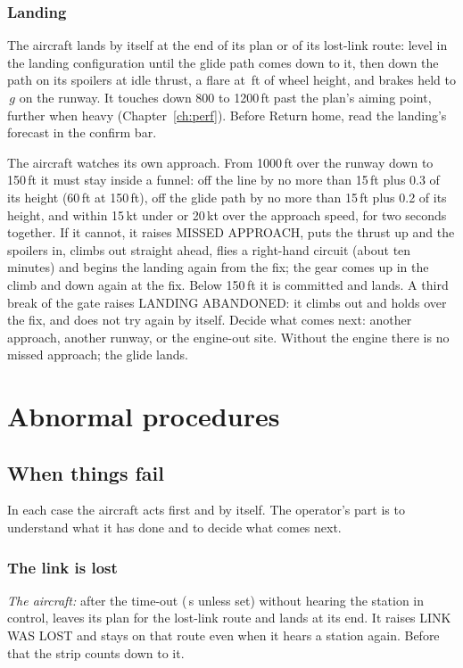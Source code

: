\documentclass[11pt,a4paper,oneside]{book}
\newcommand{\ann}[1]{\textsf{#1}}
\begin{document}
\section{Landing}
The aircraft lands by itself at the end of its plan or of its lost-link route: level in the landing configuration
until the glide path comes down to it, then down the path on its spoilers at idle thrust, a flare at \MFlareHeight\,ft
of wheel height, and brakes held to \MDecel\,$g$ on the runway. It touches down 800 to 1200\,ft past the plan's
aiming point, further when heavy (Chapter~\ref{ch:perf}). Before \ann{Return home}, read the landing's forecast in the confirm bar.

The aircraft watches its own approach. From 1000\,ft over the runway down to 150\,ft it must stay inside a funnel: off the
line by no more than 15\,ft plus 0.3 of its height (60\,ft at 150\,ft), off the glide path by no more than 15\,ft plus 0.2 of
its height, and within 15\,kt under or 20\,kt over the approach speed, for two seconds together. If it cannot, it raises
\ann{MISSED APPROACH}, puts the thrust up and the spoilers in, climbs out straight ahead, flies a right-hand circuit
(about ten minutes) and begins the landing again from the fix; the gear comes up in the climb and down again at the fix.
Below 150\,ft it is committed and lands. A third break of the gate raises \ann{LANDING ABANDONED}: it climbs out and holds
over the fix, and does not try again by itself. Decide what comes next: another approach, another runway, or the
engine-out site. Without the engine there is no missed approach; the glide lands.

\part{Abnormal procedures}
\chapter{When things fail}
In each case the aircraft acts first and by itself. The operator's part is to understand what it has done and to
decide what comes next.

\section{The link is lost}
\emph{The aircraft:} after the time-out (\MLinkTimeout\,s unless set) without hearing the station in control, leaves its plan for the lost-link
route and lands at its end. It raises \ann{LINK WAS LOST} and stays on that route even when it hears a station again.
Before that the strip counts down to it.
\end{document}
